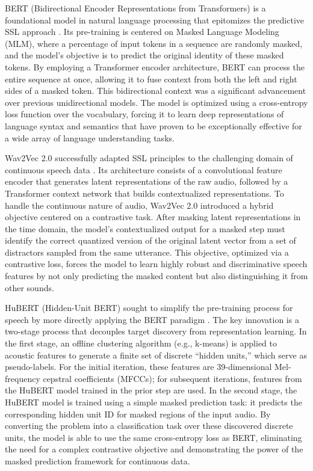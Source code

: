 \documentclass{report}
\begin{document}
BERT (Bidirectional Encoder Representations from Transformers) is a foundational model in natural language processing that epitomizes the predictive SSL approach \citep{devlin2019bertpretrainingdeepbidirectional}. Its pre-training is centered on Masked Language Modeling (MLM), where a percentage of input tokens in a sequence are randomly masked, and the model's objective is to predict the original identity of these masked tokens. By employing a Transformer encoder architecture, BERT can process the entire sequence at once, allowing it to fuse context from both the left and right sides of a masked token. This bidirectional context was a significant advancement over previous unidirectional models. The model is optimized using a cross-entropy loss function over the vocabulary, forcing it to learn deep representations of language syntax and semantics that have proven to be exceptionally effective for a wide array of language understanding tasks.

Wav2Vec 2.0 successfully adapted SSL principles to the challenging domain of continuous speech data \citep{baevski2020wav2vec20frameworkselfsupervised}. Its architecture consists of a convolutional feature encoder that generates latent representations of the raw audio, followed by a Transformer context network that builds contextualized representations. To handle the continuous nature of audio, Wav2Vec 2.0 introduced a hybrid objective centered on a contrastive task. After masking latent representations in the time domain, the model's contextualized output for a masked step must identify the correct quantized version of the original latent vector from a set of distractors sampled from the same utterance. This objective, optimized via a contrastive loss, forces the model to learn highly robust and discriminative speech features by not only predicting the masked content but also distinguishing it from other sounds.

HuBERT (Hidden-Unit BERT) sought to simplify the pre-training process for speech by more directly applying the BERT paradigm \citep{hsu2021hubertselfsupervisedspeechrepresentation}. The key innovation is a two-stage process that decouples target discovery from representation learning. In the first stage, an offline clustering algorithm (e.g., k-means) is applied to acoustic features to generate a finite set of discrete ``hidden units,'' which serve as pseudo-labels. For the initial iteration, these features are 39-dimensional Mel-frequency cepstral coefficients (MFCCs); for subsequent iterations, features from the HuBERT model trained in the prior step are used. In the second stage, the HuBERT model is trained using a simple masked prediction task: it predicts the corresponding hidden unit ID for masked regions of the input audio. By converting the problem into a classification task over these discovered discrete units, the model is able to use the same cross-entropy loss as BERT, eliminating the need for a complex contrastive objective and demonstrating the power of the masked prediction framework for continuous data.
\end{document}
